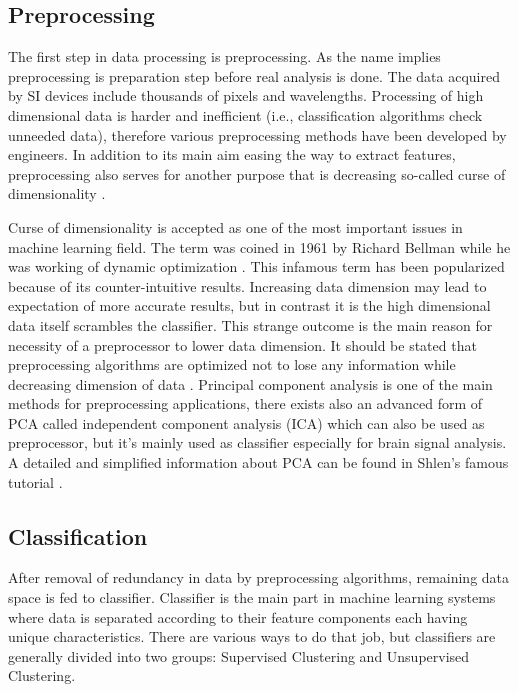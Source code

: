 \documentclass[a4paper]{article}
\begin{document}
	\subsection{Preprocessing}
    
    \hspace{5mm} The first step in data processing is preprocessing. As the name implies preprocessing is preparation step before real analysis is done. The data acquired by SI devices include thousands of pixels and wavelengths. Processing of high dimensional data is harder and inefficient (i.e., classification algorithms check unneeded data), therefore various preprocessing methods have been developed by engineers. In addition to its main aim easing the way to extract features, preprocessing also serves for another purpose that is decreasing so-called curse of dimensionality \cite{dokuz}.
    
    \medskip
    \hspace{5mm} Curse of dimensionality is accepted as one of the most important issues in machine learning field. The term was coined in 1961 by Richard Bellman while he was working of dynamic optimization \cite{onyedi}. This infamous term has been popularized because of its counter-intuitive results. Increasing data dimension may lead to expectation of more accurate results, but in contrast it is the high dimensional data itself scrambles the classifier. This strange outcome is the main reason for necessity of a preprocessor to lower data dimension.
It should be stated that preprocessing algorithms are optimized not to lose any information while decreasing dimension of data \cite{onsekiz}. Principal component analysis is one of the main methods for preprocessing applications, there exists also an advanced form of PCA called independent component analysis (ICA) which can also be used as preprocessor, but it's mainly used as classifier especially for brain signal analysis. A detailed and simplified information about PCA can be found in Shlen's famous tutorial \cite{ondokuz}.  

	
    \subsection{Classification}
    
    \hspace{5mm} After removal of redundancy in data by preprocessing algorithms, remaining data space is fed to classifier. Classifier is the main part in machine learning systems where data is separated according to their feature components each having unique characteristics. There are various ways to do that job, but classifiers are generally divided into two groups: Supervised Clustering and Unsupervised Clustering. 
    
\end{document}
